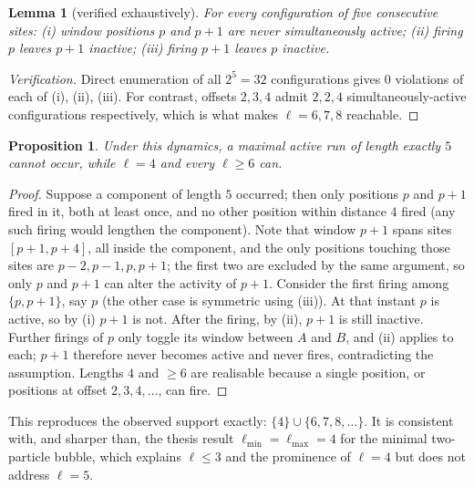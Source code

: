 \documentclass[11pt,a4paper]{article}
\newtheorem{lemma}{Lemma}
\newtheorem{proposition}{Proposition}
\begin{document}
\begin{lemma}[verified exhaustively]
\label{lem:offset1}
For every configuration of five consecutive sites:
(i) window positions $p$ and $p+1$ are never simultaneously active;
(ii) firing $p$ leaves $p+1$ inactive; (iii) firing $p+1$ leaves $p$
inactive.
\end{lemma}
\begin{proof}[Verification]
Direct enumeration of all $2^5=32$ configurations gives $0$ violations of
each of (i), (ii), (iii). For contrast, offsets $2,3,4$ admit $2,2,4$
simultaneously-active configurations respectively, which is what makes
$\ell=6,7,8$ reachable.
\end{proof}

\begin{proposition}
\label{prop:five}
Under this dynamics, a maximal active run of length exactly $5$ cannot
occur, while $\ell=4$ and every $\ell\ge6$ can.
\end{proposition}
\begin{proof}
Suppose a component of length $5$ occurred; then only positions $p$ and
$p+1$ fired in it, both at least once, and no other position within
distance $4$ fired (any such firing would lengthen the component). Note
that window $p+1$ spans sites $[p{+}1,p{+}4]$, all inside the component,
and the only positions touching those sites are $p{-}2,p{-}1,p,p{+}1$; the
first two are excluded by the same argument, so only $p$ and $p+1$ can
alter the activity of $p+1$. Consider the first firing among $\{p,p{+}1\}$,
say $p$ (the other case is symmetric using (iii)). At that instant $p$ is
active, so by (i) $p+1$ is not. After the firing, by (ii), $p+1$ is still
inactive. Further firings of $p$ only toggle its window between $A$ and $B$,
and (ii) applies to each; $p+1$ therefore never becomes active and never
fires, contradicting the assumption. Lengths $4$ and $\ge6$ are realisable
because a single position, or positions at offset $2,3,4,\dots$, can fire.
\end{proof}

This reproduces the observed support exactly: $\{4\}\cup\{6,7,8,\dots\}$. It
is consistent with, and sharper than, the thesis result
$\ell_{\min}=\ell_{\max}=4$ for the minimal two-particle bubble, which
explains $\ell\le3$ and the prominence of $\ell=4$ but does not address
$\ell=5$.

\medskip
\noindent{}
\end{document}
